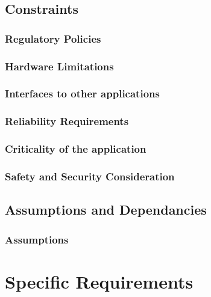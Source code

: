 \documentclass[11pt, a4paper,titlepage]{article}
\begin{document}
\subsection{Constraints}
\subsubsection{Regulatory Policies}
\subsubsection{Hardware Limitations}
\subsubsection{Interfaces to other applications}
\subsubsection{Reliability Requirements}
\subsubsection{Criticality of the application}
\subsubsection{Safety and Security Consideration}
\subsection{Assumptions and Dependancies}
\subsubsection{Assumptions}

\section{Specific Requirements}

\appendix
\end{document}
